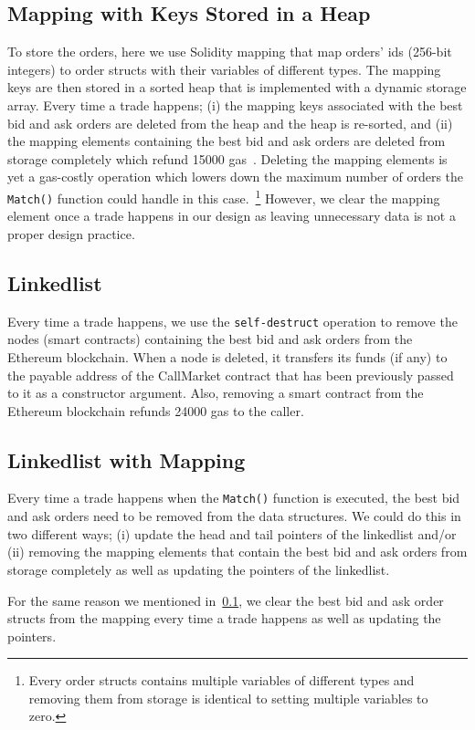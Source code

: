 
\subsection{Mapping with Keys Stored in a Heap}\label{sec:mapping_heap}

To store the orders, here we use Solidity mapping that map orders' ids (256-bit integers) to order structs with their variables of different types. The mapping keys are then stored in a sorted heap that is implemented with a dynamic storage array. Every time a trade happens; (i) the mapping keys associated with the best bid and ask orders are deleted from the heap and the heap is re-sorted, and (ii) the mapping elements containing the best bid and ask orders are deleted from storage completely which refund 15000 gas~\cite{wood2014ethereum}. Deleting the mapping elements is yet a gas-costly operation which lowers down the maximum number of orders the \texttt{Match()} function could handle in this case.~\footnote{Every order structs contains multiple variables of different types and removing them from storage is identical to setting multiple variables to zero.} However, we clear the mapping element once a trade happens in our design as leaving unnecessary data is not a proper design practice.

\subsection {Linkedlist}
Every time a trade happens, we use the \texttt{self-destruct} operation to remove the nodes (\ie smart contracts) containing the best bid and ask orders from the Ethereum blockchain. When a node is deleted, it transfers its funds (if any) to the payable address of the CallMarket contract that has been previously passed to it as a constructor argument. Also, removing a smart contract from the Ethereum blockchain refunds 24000 gas to the caller.


\subsection {Linkedlist with Mapping}
Every time a trade happens when the \texttt{Match()} function is executed, the best bid and ask orders need to be removed from the data structures. We could do this in two different ways; (i) update the head and tail pointers of the linkedlist and/or (ii) removing the mapping elements that contain the best bid and ask orders from storage completely as well as updating the pointers of the linkedlist. \par
For the same reason we mentioned in~\ref{sec:mapping_heap}, we clear the best bid and ask order structs from the mapping every time a trade happens as well as updating the pointers.




